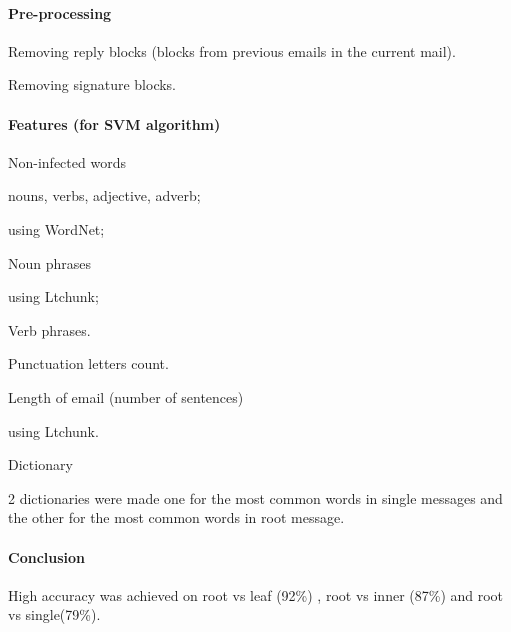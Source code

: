 \documentclass[12pt]{article}
\newenvironment{my_itemize}
{\begin{itemize}
  \setlength{\itemsep}{0cm}
  \setlength{\parskip}{0cm}}
{\end{itemize}}
\begin{document}
\paragraph{Pre-processing}
\begin{my_itemize}
    \item Removing reply blocks (blocks from previous emails in the current mail).
    \item Removing signature blocks.
\end{my_itemize}

\paragraph{Features (for SVM algorithm)}
\begin{my_itemize}
    \item Non-infected words
    \begin{my_itemize}
        \item nouns, verbs, adjective, adverb;
        \item using WordNet;
    \end{my_itemize}
    \item Noun phrases
    \begin{my_itemize}
        \item using Ltchunk;
    \end{my_itemize}
    \item Verb phrases.
    \item Punctuation letters count.
    \item Length of email (number of sentences)
    \begin{my_itemize}
        \item using Ltchunk.
    \end{my_itemize}
    \item Dictionary
    \begin{my_itemize}
        \item 2 dictionaries were made one for the most common words in single 
	      messages and the other for the most common words in root message.
    \end{my_itemize}
\end{my_itemize}

\paragraph{Conclusion}
\begin{my_itemize}
    \item High accuracy was achieved on root vs leaf (92\%) , root vs inner (87\%) and root vs single(79\%).
\end{my_itemize}
\end{document}
